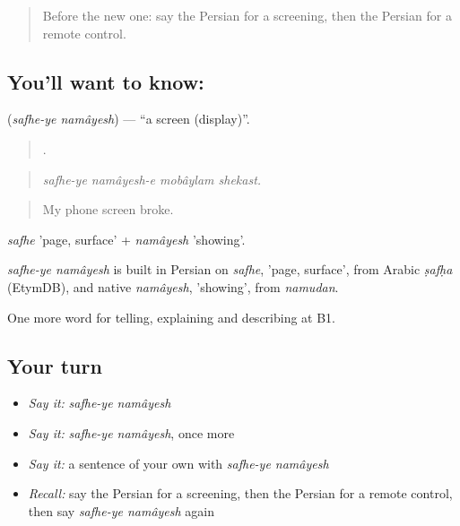 \label{lesson:FA-C532-safhe-ye-namayesh}



\begin{quote}
Before the new one: say the Persian for a screening, then the Persian for a remote control.
\end{quote}

\subsection*{You'll want to know:  }
\textbf{ } (\emph{safhe-ye namâyesh}) — \textquotedblleft{}a screen (display)\textquotedblright{}.

\begin{quote}
   .
\end{quote}

\begin{quote}
\emph{safhe-ye namâyesh-e mobâylam shekast.}
\end{quote}

\begin{quote}
My phone screen broke.
\end{quote}

\emph{safhe} 'page, surface' + \emph{namâyesh} 'showing'.

\begin{cousinweb}
\emph{safhe-ye namâyesh} is built in Persian on \emph{safhe}, 'page, surface', from Arabic \emph{ṣafḥa} (EtymDB), and native \emph{namâyesh}, 'showing', from \emph{namudan}.
\end{cousinweb}

\begin{grammarlens}[title={What you've built}]
One more word for telling, explaining and describing at B1.
\end{grammarlens}

\subsection*{Your turn}
\begin{itemize}
\raggedright
  \item \emph{Say it:} \emph{safhe-ye namâyesh}
  \item \emph{Say it:} \emph{safhe-ye namâyesh}, once more
  \item \emph{Say it:} a sentence of your own with \emph{safhe-ye namâyesh}
  \item \emph{Recall:} say the Persian for a screening, then the Persian for a remote control, then say \emph{safhe-ye namâyesh} again
\end{itemize}

